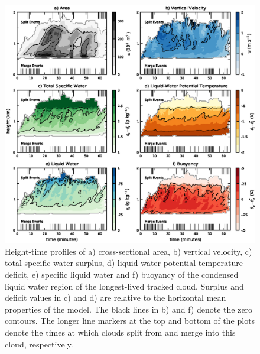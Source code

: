 \documentclass[acp]{copernicus}
\begin{document}
\begin{figure}[t]
\vspace*{2mm}
\begin{center}
\includegraphics[width=\textwidth]{./figures/example_cloud}
\end{center}
\caption{Height-time profiles of a) cross-sectional area, b) vertical 
velocity, c) total specific water surplus, d) liquid-water potential 
temperature deficit, e) specific liquid water and f) buoyancy of the condensed 
liquid water region of the longest-lived tracked cloud.  Surplus and deficit 
values in c) and d) are relative to the horizontal mean properties of the 
model.  The black lines in b) and f) denote the zero contours.  The longer line
markers at the top and bottom of the plots denote the times at which clouds 
split from and merge into this cloud, respectively.}
\label{fig:example_cloud}
\end{figure}
\end{document}

